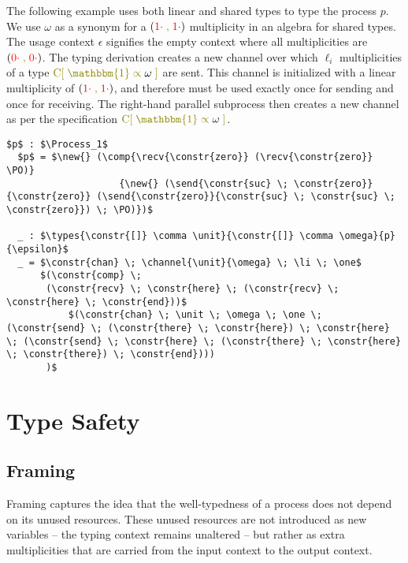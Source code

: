\documentclass[a4paper,UKenglish,cleveref, autoref, thm-restate,authorcolumns]{lipics-v2019}
\theoremstyle{definition}
\newcommand{\type}[1]{\textcolor{blue}{\operatorname{#1}}}
\newcommand{\constr}[1]{\textcolor{olive}{\operatorname{#1}}}
\newcommand{\field}[1]{\textcolor{red}{\operatorname{#1}}}
\newcommand{\PO}{\constr{\mathbf{0}}}
\newcommand{\comp}[2]{#1 \; \constr{\parallel} \; #2}
\newcommand{\new}{\constr{\boldsymbol{\nu}} \;}
\newcommand{\send}[2]{#1 \; \constr{\langle} \; #2 \;\constr{\rangle} \;}
\newcommand{\recv}[1]{#1 \; \constr{\mathbb{()}} \;}
\newcommand{\unit}{\constr{\mathbbm{1}}}
\newcommand{\channel}[2]{\constr{C[} \; #1 \; \constr{\propto} \; #2 \; \constr{]}}
\newcommand{\comma}{\; \constr{,} \;}
\newcommand{\zero}{\field{0\cdot}}
\newcommand{\one}{\field{1\cdot}}
\newcommand{\li}{\ell_i}
\newcommand{\types}[4]{#1 \; \type{\propto} \; #2 \; \type{\vdash} \; #3 \; \type{\boxtimes} \; #4}
\newcommand{\Process}{\type{PROCESS}}
\begin{document}
\begin{example}
  \label{example-derivations}
  The following example uses both linear and shared types to type the process $p$. 
  We use $\omega$ as a synonym for a $(\one \comma \one)$ multiplicity in an algebra for shared types.
  The usage context $\epsilon$ signifies the empty context where all multiplicities are $(\zero \comma \zero)$.
  The typing derivation creates a new channel over which $\li$ multiplicities of a type $\channel{\unit}{\omega}$ are sent.
  This channel is initialized with a linear multiplicity of $(\one \comma \one)$, and therefore must be used exactly once for sending and once for receiving.
  The right-hand parallel subprocess then creates a new channel as per the specification $\channel{\unit}{\omega}$.
  
  \begin{lstlisting}[mathescape]
  $p$ : $\Process_1$
  $p$ = $\new{} (\comp{\recv{\constr{zero}} (\recv{\constr{zero}} \PO)}
                    {\new{} (\send{\constr{suc} \; \constr{zero}} {\constr{zero}} (\send{\constr{zero}}{\constr{suc} \; \constr{suc} \; \constr{zero}}) \; \PO)})$

  _ : $\types{\constr{[]} \comma \unit}{\constr{[]} \comma \omega}{p}{\epsilon}$
  _ = $\constr{chan} \; \channel{\unit}{\omega} \; \li \; \one$
      $(\constr{comp} \;
       (\constr{recv} \; \constr{here} \; (\constr{recv} \; \constr{here} \; \constr{end}))$
           $(\constr{chan} \; \unit \; \omega \; \one \; (\constr{send} \; (\constr{there} \; \constr{here}) \; \constr{here} \; (\constr{send} \; \constr{here} \; (\constr{there} \; \constr{here} \; \constr{there}) \; \constr{end})))
       )$
  \end{lstlisting}
\end{example}


\section{Type Safety}
\label{type-safety}


\subsection{Framing}
\label{framing}

Framing captures the idea that the well-typedness of a process does not depend on its unused resources.
These unused resources are not introduced as new variables -- the typing context remains unaltered -- but rather as extra multiplicities that are carried from the input context to the output context.
\end{document}
